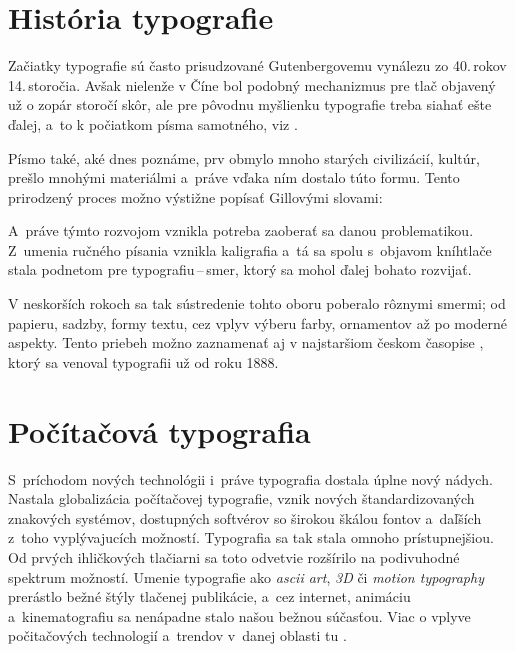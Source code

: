 \documentclass[11pt]{article}
\begin{document}
\section{História typografie}
Začiatky typografie sú často prisudzované Gutenbergovemu vynálezu zo 40.\,rokov 14.\,storočia. Avšak nielenže v Číne bol podobný mechanizmus pre tlač objavený už o zopár storočí skôr, ale pre pôvodnu myšlienku typografie treba siahať ešte ďalej, a~to k počiatkom písma samotného, viz \cite{history}.\par
Písmo také, aké dnes poznáme, prv obmylo mnoho starých civilizácií, kultúr, prešlo mnohými materiálmi a~práve vďaka ním dostalo túto formu. Tento prirodzený proces možno výstižne popísať Gillovými slovami:
\begin{quote}
  \cite{esej}
\end{quote}
A~práve týmto rozvojom vznikla potreba zaoberať sa danou problematikou. Z~umenia ručného písania vznikla kaligrafia a~tá sa spolu s~objavom kníhtlače stala podnetom pre typografiu\,--\,smer, ktorý sa mohol ďalej bohato rozvijať. \cite{kali}\par
V neskorších rokoch sa tak sústredenie tohto oboru poberalo rôznymi smermi; od papieru, sadzby, formy textu, cez vplyv výberu farby, ornamentov až po moderné aspekty.  Tento priebeh možno zaznamenať aj v najstaršiom českom časopise \cite{casopis}, ktorý sa venoval typografii už od roku 1888. 

\section{Počítačová typografia}
S~príchodom nových technológii i~práve typografia dostala úplne nový nádych.
Nastala globalizácia počítačovej typografie, vznik nových štandardizovaných znakových systémov, dostupných softvérov so širokou škálou fontov a~daľších z~toho vyplývajucích možností.
Typografia sa tak stala omnoho prístupnejšiou.
Od prvých ihličkových tlačiarni sa toto odvetvie rozšírilo na podivuhodné spektrum možností. Umenie typografie ako \emph{ascii art}, \emph{3D} či \emph{motion typography} prerástlo bežné štýly tlačenej publikácie, a~cez internet, animáciu a~kinematografiu sa nenápadne stalo našou bežnou súčasťou.
Viac o vplyve počitačových technologií a~trendov v~danej oblasti tu \cite{PCtypo}.
\end{document}
